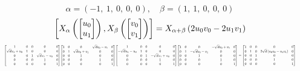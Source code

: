 \documentclass[11pt]{article}
\theoremstyle{definition}
\begin{document}
\[
\alpha = \left( -1, \  1, \  0, \  0, \  0\right), \quad \beta = \left( 1, \  1, \  0, \  0, \  0\right)
\]
\[
\scaletoalign{\textwidth}{\left[ X_{\alpha}\left(\left[\begin{matrix}u_{0}\\u_{1}\end{matrix}\right]\right), X_{\beta}\left(\left[\begin{matrix}v_{0}\\v_{1}\end{matrix}\right]\right) \right] = X_{\alpha + \beta}\left(2 u_{0} v_{0} - 2 u_{1} v_{1}\right)}
\]
\[
\scaletoalign{\textwidth}{{\left[\begin{matrix}1 & 0 & 0 & 0 & 0\\\sqrt{d} u_{1} + u_{0} & 1 & 0 & 0 & 0\\0 & 0 & 1 & \sqrt{d} u_{1} - u_{0} & 0\\0 & 0 & 0 & 1 & 0\\0 & 0 & 0 & 0 & 1\end{matrix}\right]} {\left[\begin{matrix}1 & 0 & 0 & \sqrt{d} v_{0} - v_{1} & 0\\0 & 1 & \sqrt{d} v_{0} + v_{1} & 0 & 0\\0 & 0 & 1 & 0 & 0\\0 & 0 & 0 & 1 & 0\\0 & 0 & 0 & 0 & 1\end{matrix}\right]} {\left[\begin{matrix}1 & 0 & 0 & 0 & 0\\- \sqrt{d} u_{1} - u_{0} & 1 & 0 & 0 & 0\\0 & 0 & 1 & - \sqrt{d} u_{1} + u_{0} & 0\\0 & 0 & 0 & 1 & 0\\0 & 0 & 0 & 0 & 1\end{matrix}\right]} {\left[\begin{matrix}1 & 0 & 0 & - \sqrt{d} v_{0} + v_{1} & 0\\0 & 1 & - \sqrt{d} v_{0} - v_{1} & 0 & 0\\0 & 0 & 1 & 0 & 0\\0 & 0 & 0 & 1 & 0\\0 & 0 & 0 & 0 & 1\end{matrix}\right]} = {\left[\begin{matrix}1 & 0 & 0 & 0 & 0\\0 & 1 & 0 & 2 \sqrt{d} \left(u_{0} v_{0} - u_{1} v_{1}\right) & 0\\0 & 0 & 1 & 0 & 0\\0 & 0 & 0 & 1 & 0\\0 & 0 & 0 & 0 & 1\end{matrix}\right]}}
\]
\end{document}
